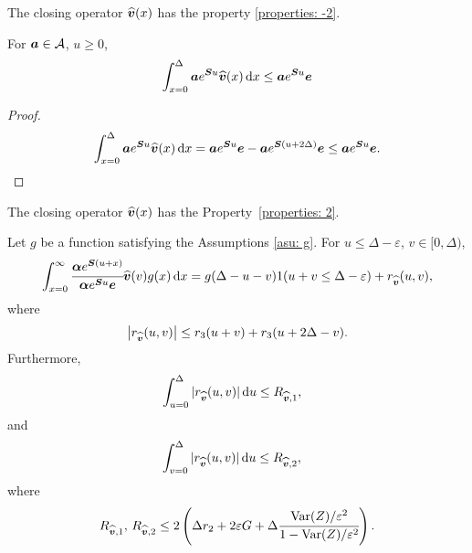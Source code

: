 \begin{lem}
	The closing operator \(\widehat{\boldsymbol v}(x)\) has the property \ref{properties: -2}. 
	
	For \(\boldsymbol a\in\mathcal A\), \(u\geq 0\), 
	\[\int_{x=0}^\Delta \boldsymbol a e^{\boldsymbol Su}\widehat{\boldsymbol v}(x)\, \mathrm{d} x\leq\boldsymbol ae^{\boldsymbol Su}\boldsymbol e\]
\end{lem}
\begin{proof}
	\[\int_{x=0}^\Delta \boldsymbol a e^{\boldsymbol Su}\widehat{\boldsymbol v}(x)\, \mathrm{d} x=\boldsymbol ae^{\boldsymbol Su}\boldsymbol e-\boldsymbol ae^{\boldsymbol S(u+2\Delta)}\boldsymbol e\leq \boldsymbol ae^{\boldsymbol Su}\boldsymbol e.\]
\end{proof}

\begin{cor}\label{cor: cond bnd 2 U}
	The closing operator \(\widehat{\boldsymbol v}(x)\) has the Property~\ref{properties: 2}.

	Let \(g\) be a function satisfying the Assumptions \ref{asu: g}. For \(u\leq \Delta-\varepsilon \), \(v\in[ 0,\Delta)\), 
	\[\int_{x=0}^\infty \cfrac{\boldsymbol \alpha  e^{\boldsymbol{S} (u+x)} }{\boldsymbol \alpha  e^{\boldsymbol{S} u} \boldsymbol e} {\widehat{\boldsymbol v}}(v)g(x)\, \mathrm{d} x = g(\Delta-u-v) 1(u+v\leq\Delta-\varepsilon) + r_{\widehat{\boldsymbol v}} (u,v),\]
	where 
	\[\left|r_{\widehat{\boldsymbol v}} (u,v)\right|\leq r_3 (u+v) + r_3 (u+2\Delta - v).\]
	Furthermore,  
	\begin{align*}
		&\int_{u=0}^{\Delta}| r_{\widehat{\boldsymbol v}}(u,v)|\, \mathrm{d} u
		\leq R_{{\widehat{\boldsymbol v}},1},
	\end{align*}
	and
	\begin{align*}
		&\int_{v=0}^{\Delta}| r_{\widehat{\boldsymbol v}}(u,v)|\, \mathrm{d} u
		\leq R_{{\widehat{\boldsymbol v}},2},
	\end{align*}
	where 
	\[R_{{\widehat{\boldsymbol v}},1},\, R_{{\widehat{\boldsymbol v}},2} \leq 2\left(\Delta r_2 + 2\varepsilon G + \Delta\cfrac{\mathrm{Var}(Z)/\varepsilon^2}{1-\mathrm{Var}(Z)/\varepsilon^2}\right).\]
\end{cor}
